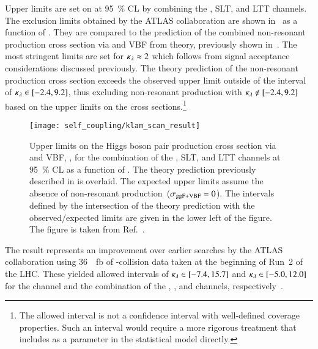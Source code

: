 Upper limits are set on \xsecggfvbf at \SI{95}{\percent} CL by
combining the \hadhad, \lephad SLT, and \lephad LTT channels. The
exclusion limits obtained by the ATLAS collaboration are shown
in~ as a function of \klambda. They are
compared to the prediction of the combined non-resonant \HH production
cross section via \ggF and VBF from theory, previously shown
in~. The most stringent limits are set for
$\kappa_{\lambda} \approx 2$ which follows from signal acceptance
considerations discussed previously. The theory prediction of the
non-resonant \HH production cross section exceeds the observed upper
limit outside of the interval of \mbox{$\kappa_{\lambda} \in [-2.4, 9.2]$},
thus excluding non-resonant \HH production with
\mbox{$\kappa_{\lambda} \notin [-2.4, 9.2]$} based on the upper limits on the
cross sections.\footnote{The allowed \klambda interval is not a
  confidence interval with well-defined coverage properties. Such an
  interval would require a more rigorous treatment that includes
  \klambda as a parameter in the statistical model directly.}

\begin{figure}[htbp]
  \centering

  \texttt{[image: self\_coupling/klam\_scan\_result]}

  \caption{Upper limits on the Higgs boson pair production cross
    section via \ggF and VBF, \xsecggfvbf, for the combination of the
    \hadhad, \lephad SLT, and \lephad LTT channels at
    \SI{95}{\percent} CL as a function of \klambda. The theory
    prediction previously described in  is
    overlaid. The expected upper limits assume the absence of
    non-resonant \HH production~($\sigma_{\text{ggF+VBF}} = 0$). The \klambda
    intervals defined by the intersection of the theory prediction
    with the observed/expected limits are given in the lower left of
    the figure. The figure is taken from
    Ref.~\cite{ATLAS-CONF-2021-052}.}%
  \label{fig:klambda_scan}
\end{figure}

The result represents an improvement over earlier searches by the
ATLAS collaboration using \SI{36}{\per\femto\barn} of \pp-collision
data taken at the beginning of Run~2 of the LHC. These yielded allowed
intervals of \mbox{$\kappa_{\lambda} \in [-7.4, 15.7]$} and
\mbox{$\kappa_{\lambda} \in [-5.0, 12.0]$} for the \bbtautau channel and the
combination of the \bbtautau, \bbbb, and \bbyy channels,
respectively~\cite{HDBS-2018-58}.

